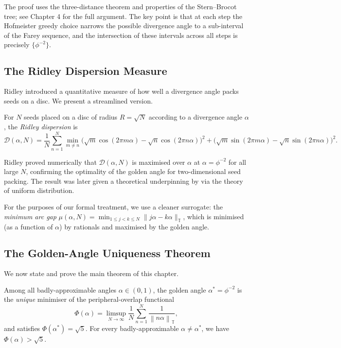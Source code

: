 The proof uses the three-distance theorem and properties of the
Stern–Brocot tree; see \cite{jean1994phyllotaxis} Chapter 4 for the
full argument.  The key point is that at each step the Hofmeister
greedy choice narrows the possible divergence angle to a sub-interval
of the Farey sequence, and the intersection of these intervals across
all steps is precisely $\{\phi^{-2}\}$.

\subsection{The Ridley Dispersion Measure}
\label{subsec:ridley}

Ridley \cite{ridley1982packing} introduced a quantitative measure of
how well a divergence angle packs seeds on a disc.  We present a
streamlined version.

\begin{definition}\label{def:ridley}
For $N$ seeds placed on a disc of radius $R = \sqrt{N}$ according to
a divergence angle $\alpha$, the \emph{Ridley dispersion} is
\[
  \mathcal{D}(\alpha, N) = \frac{1}{N} \sum_{n=1}^{N}
  \min_{m \neq n} \bigl(\sqrt{m}\cos(2\pi m\alpha) - \sqrt{n}\cos(2\pi n\alpha)\bigr)^2
  + \bigl(\sqrt{m}\sin(2\pi m\alpha) - \sqrt{n}\sin(2\pi n\alpha)\bigr)^2.
\]
\end{definition}

Ridley proved numerically that $\mathcal{D}(\alpha, N)$ is maximised
over $\alpha$ at $\alpha = \phi^{-2}$ for all large $N$, confirming
the optimality of the golden angle for two-dimensional seed packing.
The result was later given a theoretical underpinning by
\cite{mitchison1977phyllotaxis} via the theory of uniform distribution.

For the purposes of our formal treatment, we use a cleaner surrogate:
the \emph{minimum arc gap} $\mu(\alpha, N) = \min_{1 \leq j < k \leq N}
\|j\alpha - k\alpha\|_{\mathbb{T}}$, which is minimised (as a function
of $\alpha$) by rationals and maximised by the golden angle.

\subsection{The Golden-Angle Uniqueness Theorem}
\label{subsec:uniqueness-theorem}

We now state and prove the main theorem of this chapter.

\begin{theorem}\label{thm:golden-angle-uniqueness}
Among all badly-approximable angles $\alpha \in (0,1)$, the golden
angle $\alpha^* = \phi^{-2}$ is the \emph{unique} minimiser of the
peripheral-overlap functional
\[
  \Phi(\alpha) = \limsup_{N \to \infty} \frac{1}{N} \sum_{n=1}^{N}
  \frac{1}{\left\| n\alpha \right\|_{\mathbb{T}}},
\]
and satisfies $\Phi(\alpha^*) = \sqrt{5}$.  For every badly-approximable
$\alpha \neq \alpha^*$, we have $\Phi(\alpha) > \sqrt{5}$.
\end{theorem}

